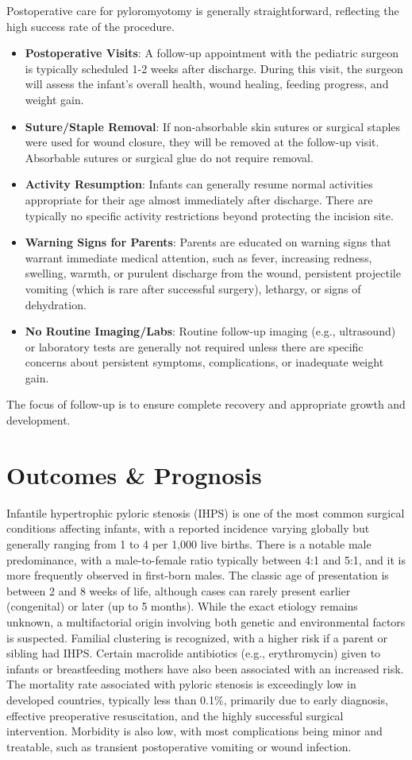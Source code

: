 Postoperative care for pyloromyotomy is generally straightforward, reflecting the high success rate of the procedure.

\begin{itemize}
  \item \textbf{Postoperative Visits}: A follow-up appointment with the pediatric surgeon is typically scheduled 1-2 weeks after discharge. During this visit, the surgeon will assess the infant's overall health, wound healing, feeding progress, and weight gain.
  \item \textbf{Suture/Staple Removal}: If non-absorbable skin sutures or surgical staples were used for wound closure, they will be removed at the follow-up visit. Absorbable sutures or surgical glue do not require removal.
  \item \textbf{Activity Resumption}: Infants can generally resume normal activities appropriate for their age almost immediately after discharge. There are typically no specific activity restrictions beyond protecting the incision site.
  \item \textbf{Warning Signs for Parents}: Parents are educated on warning signs that warrant immediate medical attention, such as fever, increasing redness, swelling, warmth, or purulent discharge from the wound, persistent projectile vomiting (which is rare after successful surgery), lethargy, or signs of dehydration.
  \item \textbf{No Routine Imaging/Labs}: Routine follow-up imaging (e.g., ultrasound) or laboratory tests are generally not required unless there are specific concerns about persistent symptoms, complications, or inadequate weight gain.
\end{itemize}
The focus of follow-up is to ensure complete recovery and appropriate growth and development.

\section*{Outcomes \& Prognosis}
Infantile hypertrophic pyloric stenosis (IHPS) is one of the most common surgical conditions affecting infants, with a reported incidence varying globally but generally ranging from 1 to 4 per 1,000 live births. There is a notable male predominance, with a male-to-female ratio typically between 4:1 and 5:1, and it is more frequently observed in first-born males. The classic age of presentation is between 2 and 8 weeks of life, although cases can rarely present earlier (congenital) or later (up to 5 months). While the exact etiology remains unknown, a multifactorial origin involving both genetic and environmental factors is suspected. Familial clustering is recognized, with a higher risk if a parent or sibling had IHPS. Certain macrolide antibiotics (e.g., erythromycin) given to infants or breastfeeding mothers have also been associated with an increased risk. The mortality rate associated with pyloric stenosis is exceedingly low in developed countries, typically less than 0.1\%, primarily due to early diagnosis, effective preoperative resuscitation, and the highly successful surgical intervention. Morbidity is also low, with most complications being minor and treatable, such as transient postoperative vomiting or wound infection.

